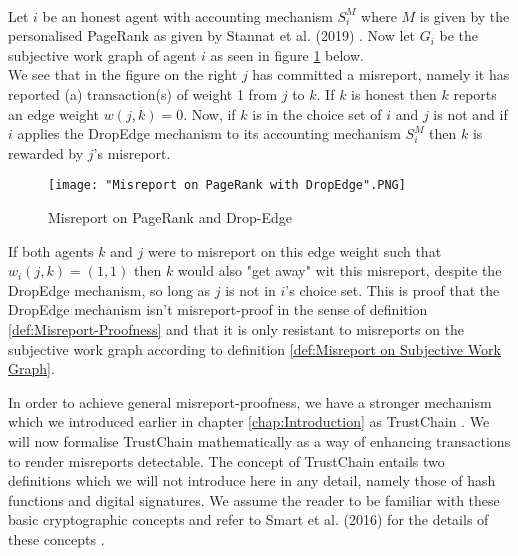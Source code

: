 \begin{example}[]\ \\
\noindent{}Let $i$ be an honest agent with accounting mechanism $S^M_i$ where $M$ is given by the personalised PageRank as given by Stannat et al. (2019) \cite{A Random Walk Based Trust Ranking in Distributed Systems}. Now let $G_i$ be the subjective work graph of agent $i$ as seen in figure \ref{fig:Misreport on PageRank and Drop-Edge} below.\vspace{1em}\\

\noindent{}We see that in the figure on the right $j$ has committed a misreport, namely it has reported (a) transaction(s) of weight 1 from $j$ to $k$. If $k$ is honest then $k$ reports an edge weight $w(j,k)=0$. Now, if $k$ is in the choice set of $i$ and $j$ is not and if $i$ applies the DropEdge mechanism to its accounting mechanism $S^M_i$ then $k$ is rewarded by $j$'s misreport.\vspace{1em}\\

\begin{figure}[H]
\begin{center}
\texttt{[image: "Misreport on PageRank with DropEdge".PNG]}
\caption{Misreport on PageRank and Drop-Edge}
\label{fig:Misreport on PageRank and Drop-Edge}
\end{center}
\end{figure}

\noindent{}If both agents $k$ and $j$ were to misreport on this edge weight such that $w_i(j,k)=(1,1)$ then $k$ would also "get away" wit this misreport, despite the DropEdge mechanism, so long as $j$ is not in $i$'s choice set. This is proof that the DropEdge mechanism isn't misreport-proof in the sense of definition \ref{def:Misreport-Proofness} and that it is only resistant to misreports on the subjective work graph according to definition \ref{def:Misreport on Subjective Work Graph}. \vspace{1em}\\
\end{example}

\noindent{}In order to achieve general misreport-proofness, we have a stronger mechanism which we introduced earlier in chapter \ref{chap:Introduction} as TrustChain \cite{TrustChain: A Sybil-resistant scalable blockchain}. We will now formalise TrustChain mathematically as a way of enhancing transactions to render misreports detectable. The concept of TrustChain entails two definitions which we will not introduce here in any detail, namely those of hash functions and digital signatures. We assume the reader to be familiar with these basic cryptographic concepts and refer to Smart et al. (2016) for the details of these concepts \cite{Cryptography made simple}. \vspace{1em}\\ 

